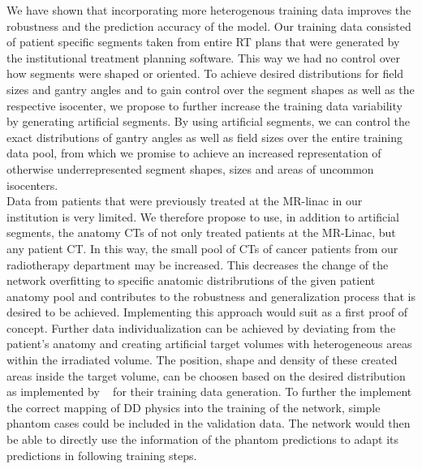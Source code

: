 We have shown that incorporating more heterogenous training data improves the robustness and the prediction accuracy of the model.
Our training data consisted of patient specific segments taken from entire \acs{RT} plans that were generated by the institutional treatment planning software.
This way we had no control over how segments were shaped or oriented.
To achieve desired distributions for field sizes and gantry angles and to gain control over the segment shapes as well as the respective isocenter, we propose to further increase the training data variability by generating artificial segments.
By using artificial segments, we can control the exact distributions of gantry angles as well as field sizes over the entire training data pool, from which we promise to achieve an increased representation of otherwise underrepresented segment shapes, sizes and areas of uncommon isocenters.\\
Data from patients that were previously treated at the MR-linac in our institution is very limited.
We therefore propose to use, in addition to artificial segments, the anatomy CTs of not only treated patients at the MR-Linac, but any patient CT\@.
In this way, the small pool of CTs of cancer patients from our radiotherapy department may be increased.
This decreases the change of the network overfitting to specific anatomic distribrutions of the given patient anatomy pool and contributes to the robustness and generalization process that is desired to be achieved.
Implementing this approach would suit as a first proof of concept. 
Further data individualization can be achieved by deviating from the patient's anatomy and creating artificial target volumes with heterogeneous areas within the irradiated volume.
The position, shape and density of these created areas inside the target volume, can be choosen based on the desired distribution as implemented by \citeauthor{neishabouri_long_2021}~\cite{neishabouri_long_2021} for their training data generation.
To further the implement the correct mapping of \acs{DD} physics into the training of the network, simple phantom cases could be included in the validation data. The network would then be able to directly use the information of the phantom predictions to adapt its predictions in following training steps.\\

